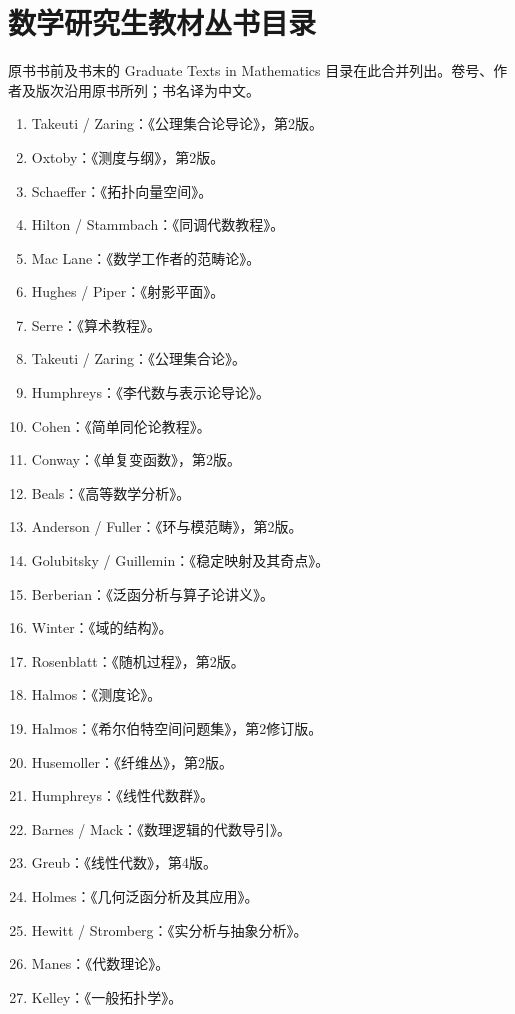 \chapter*{数学研究生教材丛书目录}
原书书前及书末的 Graduate Texts in Mathematics 目录在此合并列出。卷号、作者及版次沿用原书所列；书名译为中文。
\begin{enumerate}[leftmargin=3em,label=\arabic*.]
\item Takeuti / Zaring：《公理集合论导论》，第2版。
\item Oxtoby：《测度与纲》，第2版。
\item Schaeffer：《拓扑向量空间》。
\item Hilton / Stammbach：《同调代数教程》。
\item Mac Lane：《数学工作者的范畴论》。
\item Hughes / Piper：《射影平面》。
\item Serre：《算术教程》。
\item Takeuti / Zaring：《公理集合论》。
\item Humphreys：《李代数与表示论导论》。
\item Cohen：《简单同伦论教程》。
\item Conway：《单复变函数》，第2版。
\item Beals：《高等数学分析》。
\item Anderson / Fuller：《环与模范畴》，第2版。
\item Golubitsky / Guillemin：《稳定映射及其奇点》。
\item Berberian：《泛函分析与算子论讲义》。
\item Winter：《域的结构》。
\item Rosenblatt：《随机过程》，第2版。
\item Halmos：《测度论》。
\item Halmos：《希尔伯特空间问题集》，第2修订版。
\item Husemoller：《纤维丛》，第2版。
\item Humphreys：《线性代数群》。
\item Barnes / Mack：《数理逻辑的代数导引》。
\item Greub：《线性代数》，第4版。
\item Holmes：《几何泛函分析及其应用》。
\item Hewitt / Stromberg：《实分析与抽象分析》。
\item Manes：《代数理论》。
\item Kelley：《一般拓扑学》。

\end{enumerate}
